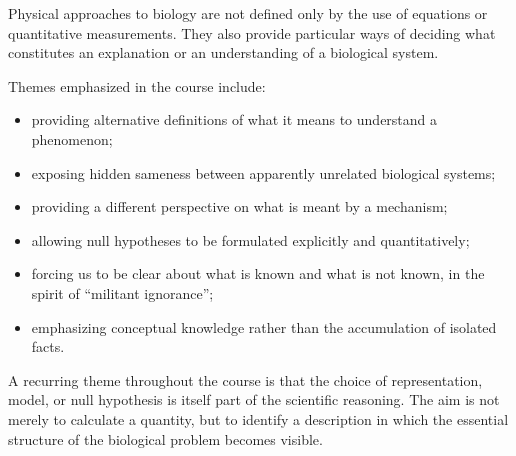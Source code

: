 Physical approaches to biology are not defined only by the use of equations or quantitative measurements.
They also provide particular ways of deciding what constitutes an explanation or an understanding of a biological system.

Themes emphasized in the course include:

\begin{itemize}
    \item providing alternative definitions of what it means to understand a phenomenon;
    \item exposing hidden sameness between apparently unrelated biological systems;
    \item providing a different perspective on what is meant by a mechanism;
    \item allowing null hypotheses to be formulated explicitly and quantitatively;
    \item forcing us to be clear about what is known and what is not known, in the spirit of ``militant ignorance'';
    \item emphasizing conceptual knowledge rather than the accumulation of isolated facts.
\end{itemize}

A recurring theme throughout the course is that the choice of representation, model, or null hypothesis is itself part of the scientific reasoning.
The aim is not merely to calculate a quantity, but to identify a description in which the essential structure of the biological problem becomes visible.